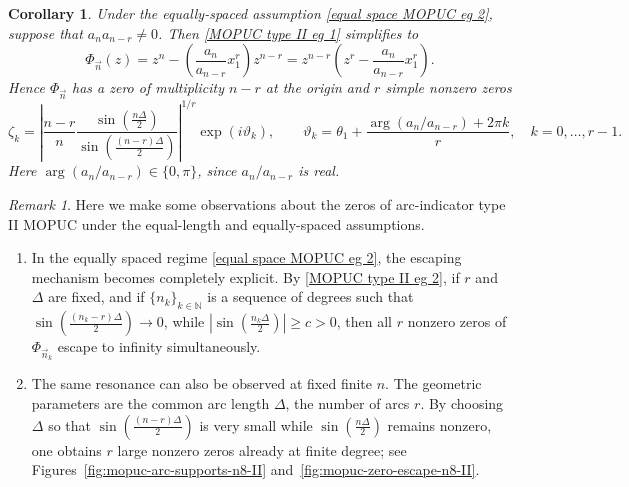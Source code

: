 \documentclass[a4paper,10pt,leqno]{amsart}
\numberwithin{equation}{section}
\newtheorem{corollary}[theorem]{Corollary}
\theoremstyle{remark}
\newtheorem{remark}{Remark}
\begin{document}
\begin{corollary} \label{cor: MOPUC type II eg 2}
Under the equally-spaced assumption \eqref{equal space MOPUC eg 2}, suppose that $a_n a_{n-r}\neq 0$. Then \eqref{MOPUC type II eg 1} simplifies to
\begin{equation} \label{MOPUC type II eg 2}
\Phi_{\vec n}(z)=z^n-\left(\frac{a_n}{a_{n-r}}x_1^r\right)z^{n-r}=z^{n-r}\left(z^r-\frac{a_n}{a_{n-r}}x_1^r\right).
\end{equation}
Hence $\Phi_{\vec n}$ has a zero of multiplicity $n-r$ at the origin and $r$ simple nonzero zeros
\begin{equation}\label{zek}
    \zeta_k=\left|\frac{n-r}{n}\frac{\sin\left(\frac{n\Delta}{2}\right)}{\sin\left(\frac{(n-r)\Delta}{2}\right)}\right|^{1/r}\exp\left(i \vartheta_k  \right), \qquad \vartheta_k=\theta_1+\frac{\arg(a_n/a_{n-r})+2\pi k}{r}, \quad k=0,\ldots,r-1.
\end{equation}
Here $\arg(a_n/a_{n-r})\in\{0,\pi\}$, since $a_n/a_{n-r}$ is real.

\end{corollary}


\begin{remark} \label{remark MOPUC eg 2} Here we make some observations about the zeros of arc-indicator type II MOPUC under the equal-length and equally-spaced assumptions. \phantom{newline}
\begin{enumerate}
\item 
In the equally spaced regime \eqref{equal space MOPUC eg 2}, the escaping mechanism becomes completely explicit. By \eqref{MOPUC type II eg 2},   if $r$ and $\Delta$ are fixed, and if $\{n_k\}_{k\in\mathbb N}$ is a sequence of degrees such that $\sin\left(\frac{(n_k-r)\Delta}{2}\right)\to 0$, while $\left|\sin\left(\frac{n_k\Delta}{2}\right)\right|\geq c>0$, then all $r$ nonzero zeros of $\Phi_{\vec n_k}$ escape to infinity simultaneously.
\item
The same resonance can also be observed at fixed finite $n$. The geometric parameters are the common arc length $\Delta$, the number of arcs $r$. By choosing $\Delta$ so that $\sin\left(\frac{(n-r)\Delta}{2}\right)$ is very small while $\sin\left(\frac{n\Delta}{2}\right)$ remains nonzero, one obtains $r$ large nonzero zeros already at finite degree; see Figures~\ref{fig:mopuc-arc-supports-n8-II} and~\ref{fig:mopuc-zero-escape-n8-II}.
\end{enumerate}
\end{remark}

 
\end{document}
